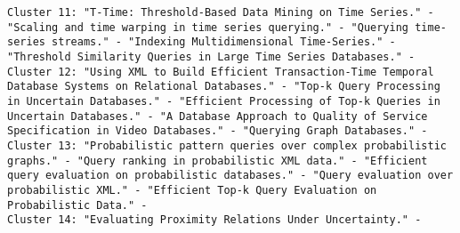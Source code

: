 \documentclass[11pt]{article}
\begin{document}
\begin{verbatim}
Cluster 11: "T-Time: Threshold-Based Data Mining on Time Series." - "Scaling and time warping in time series querying." - "Querying time-series streams." - "Indexing Multidimensional Time-Series." - "Threshold Similarity Queries in Large Time Series Databases." - 
Cluster 12: "Using XML to Build Efficient Transaction-Time Temporal Database Systems on Relational Databases." - "Top-k Query Processing in Uncertain Databases." - "Efficient Processing of Top-k Queries in Uncertain Databases." - "A Database Approach to Quality of Service Specification in Video Databases." - "Querying Graph Databases." - 
Cluster 13: "Probabilistic pattern queries over complex probabilistic graphs." - "Query ranking in probabilistic XML data." - "Efficient query evaluation on probabilistic databases." - "Query evaluation over probabilistic XML." - "Efficient Top-k Query Evaluation on Probabilistic Data." - 
Cluster 14: "Evaluating Proximity Relations Under Uncertainty." - 



\end{verbatim}
\end{document}
